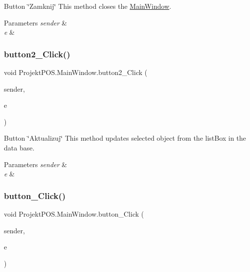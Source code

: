 Button \char`\"{}\+Zamknij\char`\"{} This method closes the \hyperlink{class_projekt_p_o_s_1_1_main_window}{Main\+Window}. 


\begin{DoxyParams}{Parameters}
{\em sender} & \\
\hline
{\em e} & \\
\hline
\end{DoxyParams}
\mbox{\label{class_projekt_p_o_s_1_1_main_window_a955fd8db95c7491807d1262fdb15a115}} 
\subsubsection{\texorpdfstring{button2\+\_\+\+Click()}{button2\_Click()}}
{\footnotesize\ttfamily void Projekt\+P\+O\+S.\+Main\+Window.\+button2\+\_\+\+Click (\begin{DoxyParamCaption}\item[{object}]{sender,  }\item[{Routed\+Event\+Args}]{e }\end{DoxyParamCaption})\hspace{0.3cm}{\ttfamily [private]}}



Button \char`\"{}\+Aktualizuj\char`\"{} This method updates selected object from the list\+Box in the data base. 


\begin{DoxyParams}{Parameters}
{\em sender} & \\
\hline
{\em e} & \\
\hline
\end{DoxyParams}
\mbox{\label{class_projekt_p_o_s_1_1_main_window_a98a2b1c31cf135c85a3c8bc12a9879ad}} 
\subsubsection{\texorpdfstring{button\+\_\+\+Click()}{button\_Click()}}
{\footnotesize\ttfamily void Projekt\+P\+O\+S.\+Main\+Window.\+button\+\_\+\+Click (\begin{DoxyParamCaption}\item[{object}]{sender,  }\item[{Routed\+Event\+Args}]{e }\end{DoxyParamCaption})\hspace{0.3cm}{\ttfamily [private]}}



